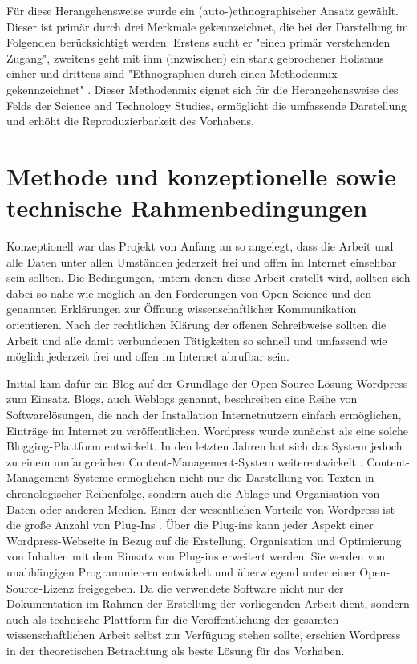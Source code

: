 Für diese Herangehensweise wurde ein (auto-)ethnographischer Ansatz gewählt. Dieser ist primär durch drei Merkmale gekennzeichnet, die bei der Darstellung im Folgenden berücksichtigt werden:  Erstens sucht er  "einen primär verstehenden Zugang", zweitens geht mit ihm (inzwischen) ein stark gebrochener Holismus einher und drittens sind "Ethnographien durch einen Methodenmix gekennzeichnet" \cite{Bachmann_2011}. Dieser Methodenmix eignet sich für die Herangehensweise des Felds der Science and Technology Studies, ermöglicht die umfassende Darstellung und erhöht die Reproduzierbarkeit des Vorhabens.

\section{Methode und konzeptionelle sowie technische Rahmenbedingungen}

Konzeptionell war das Projekt von Anfang an so angelegt, dass die Arbeit und alle Daten unter allen Umständen jederzeit frei und offen im Internet einsehbar sein sollten. Die Bedingungen, untern denen diese Arbeit erstellt wird, sollten sich dabei so nahe wie möglich an den Forderungen von Open Science und den genannten Erklärungen zur Öffnung wissenschaftlicher Kommunikation orientieren. Nach der rechtlichen Klärung der offenen Schreibweise sollten die Arbeit und alle damit verbundenen Tätigkeiten so schnell und umfassend wie möglich jederzeit frei und offen im Internet abrufbar sein.

Initial kam dafür ein Blog auf der Grundlage der Open-Source-Lösung Wordpress zum Einsatz. Blogs, auch Weblogs genannt, beschreiben eine Reihe von Softwarelösungen, die nach der Installation Internetnutzern einfach ermöglichen, Einträge im Internet zu veröffentlichen. Wordpress wurde zunächst als eine solche Blogging-Plattform entwickelt. In den letzten Jahren hat sich das System jedoch zu einem umfangreichen Content-Management-System weiterentwickelt \cite{Patel_2011}. Content-Management-Systeme ermöglichen nicht nur die Darstellung von Texten in chronologischer Reihenfolge, sondern auch die Ablage und Organisation von Daten oder anderen Medien. Einer der wesentlichen Vorteile von Wordpress ist die große Anzahl von Plug-Ins \cite{Patel_2011}. Über die Plug-ins kann jeder Aspekt einer Wordpress-Webseite in Bezug auf die Erstellung, Organisation und Optimierung von Inhalten mit dem Einsatz von Plug-ins erweitert werden. Sie werden von unabhängigen Programmierern entwickelt und überwiegend unter einer Open-Source-Lizenz freigegeben. Da die verwendete Software nicht nur der Dokumentation im Rahmen der Erstellung der vorliegenden Arbeit dient, sondern auch als technische Plattform für die Veröffentlichung der gesamten wissenschaftlichen Arbeit selbst zur Verfügung stehen sollte, erschien Wordpress in der theoretischen Betrachtung als beste Lösung für das Vorhaben.

